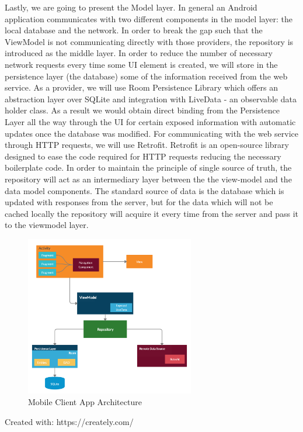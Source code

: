 Lastly, we are going to present the Model layer. In general an Android application communicates with two different components in the model layer: the local database and the network. In order to break the gap such that the ViewModel is not communicating directly with those providers, the repository is introduced as the middle layer. In order to reduce the number of necessary network requests every time some UI element is created, we will store in the persistence layer (the database) some of the information received from the web service. As a provider, we will use Room Persistence Library which offers an abstraction layer over SQLite and integration with LiveData - an observable data holder class. As a result we would obtain direct binding from the Persistence Layer all the way through the UI for certain exposed information with automatic updates once the database was modified. For communicating with the web service through HTTP requests, we will use Retrofit. Retrofit is an open-source library designed to ease the code required for HTTP requests reducing the necessary boilerplate code. In order to maintain the principle of single source of truth, the repository will act as an intermediary layer between the the view-model and the data model components. The standard source of data is the database which is updated with responses from the server, but for the data which will not be cached locally the repository will acquire it every time from the server and pass it to the viewmodel layer.

\begin{figure}[H]
\centering
\includegraphics[height=7cm]{images/AndroidArchitecture.png} 
\caption{Mobile Client App Architecture}
\label{fig:mobielclientapparchitecture}
\end{figure}
\begin{flushright}
Created with: https://creately.com/
\end{flushright}


